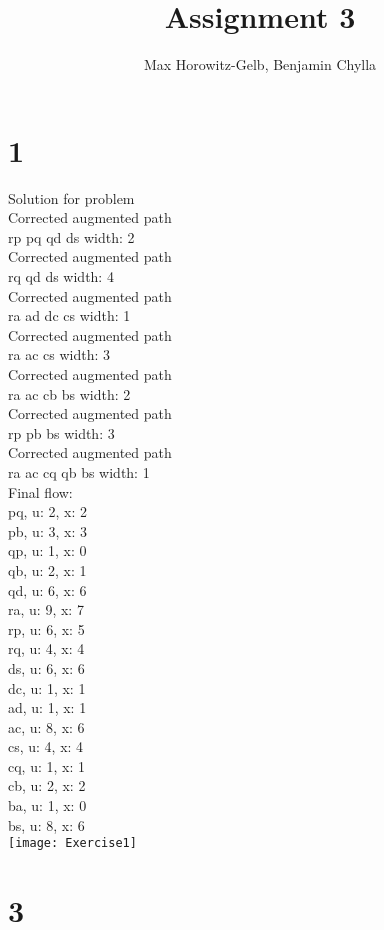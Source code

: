 \documentclass[]{article}
\title{\vspace{-2cm} Assignment 3}
\author{Max Horowitz-Gelb, Benjamin Chylla}
\begin{document}
\maketitle

\section*{1}
Solution for problem\\
Corrected augmented path\\
rp pq qd ds width: 2\\
Corrected augmented path\\
rq qd ds width: 4\\
Corrected augmented path\\
ra ad dc cs width: 1\\
Corrected augmented path\\
ra ac cs width: 3\\
Corrected augmented path\\
ra ac cb bs width: 2\\
Corrected augmented path\\
rp pb bs width: 3\\
Corrected augmented path\\
ra ac cq qb bs width: 1\\
Final flow:\\
pq, u: 2, x: 2\\
pb, u: 3, x: 3\\
qp, u: 1, x: 0\\
qb, u: 2, x: 1\\
qd, u: 6, x: 6\\
ra, u: 9, x: 7\\
rp, u: 6, x: 5\\
rq, u: 4, x: 4\\
ds, u: 6, x: 6\\
dc, u: 1, x: 1\\
ad, u: 1, x: 1\\
ac, u: 8, x: 6\\
cs, u: 4, x: 4\\
cq, u: 1, x: 1\\
cb, u: 2, x: 2\\
ba, u: 1, x: 0\\
bs, u: 8, x: 6\\

\texttt{[image: Exercise1]}

\section*{3}
\end{document}
